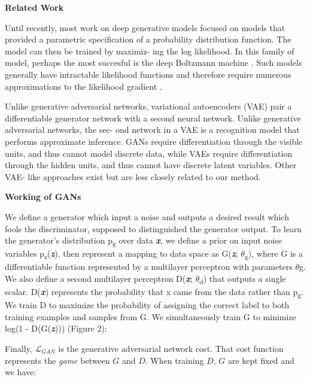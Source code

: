 \documentclass{article}
\begin{document}
\medskip
\begin{center}
    {\Large{\textbf{Related Work}}}
\end{center}
Until recently, most work on deep generative models focused on models that provided a parametric
specification of a probability distribution function. The model can then be trained by maximiz-
ing the log likelihood. In this family of model, perhaps the most succesful is the deep Boltzmann
machine . Such models generally have intractable likelihood functions and therefore require
numerous approximations to the likelihood gradient .

Unlike generative adversarial networks, variational autoencoders (VAE) pair a differentiable
generator network with a second neural network. Unlike generative adversarial networks, the sec-
ond network in a VAE is a recognition model that performs approximate inference. GANs require
differentiation through the visible units, and thus cannot model discrete data, while VAEs require
differentiation through the hidden units, and thus cannot have discrete latent variables. Other VAE-
like approaches exist but are less closely related to our method.
\medskip


\begin{center}
    {\Large{\textbf{Working of GANs}}}
\end{center}
We define a generator which input a noise and outputs a desired result which fools the discriminator, supposed to distinguished the generator output. To learn the generator’s distribution p\textsubscript{g} over data \textbf{\textit{x}}, we define a prior on input noise variables p\textsubscript{z}(\textbf{\textit{z}}), then represent a mapping to data space as G(\textbf{\textit{z}}; $\theta$\textsubscript{g}), where G is a differentiable function represented by a multilayer perceptron with parameters $\theta$g. We also define a
second multilayer perceptron D(\textbf{\textit{x}}; $\theta$\textsubscript{d}) that outputs a single scalar. D(\textbf{\textit{x}}) represents the probability
that x came from the data rather than p\textsubscript{g}. We train D to maximize the probability of assigning the
correct label to both training examples and samples from G. We simultaneously train G to minimize
log(1 - D(G(\textbf{\textit{z}}))) (Figure 2):


Finally, $\mathcal{L}_{GAN}$ is the generative adversarial network cost. That cost function represents the \textit{game} between $G$ and $D$.
When training $D$, $G$ are kept fixed and we have: 
\end{document}
